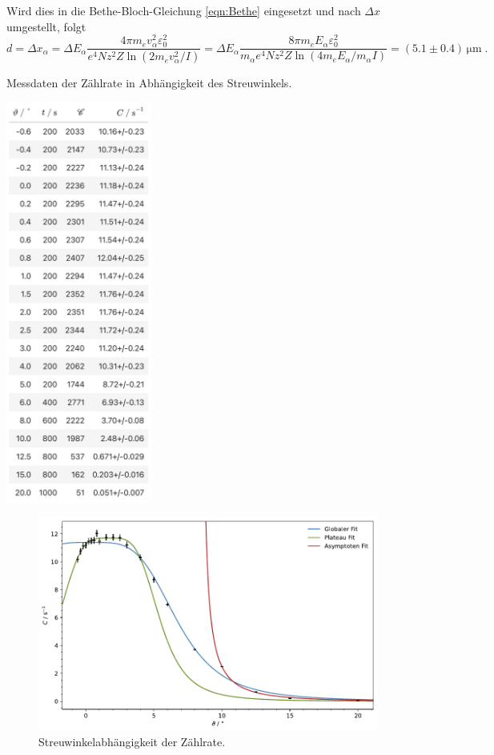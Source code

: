 Wird dies in die Bethe-Bloch-Gleichung \ref{eqn:Bethe} eingesetzt und nach $\Delta x$ umgestellt, folgt
$$d = \Delta x_\alpha = \Delta E_\alpha \frac{4\pi m_e v_\alpha^2 \varepsilon_0^2}{e^4 N z^2 Z \ln (2m_e v_\alpha^2 / I)}
= \Delta E_\alpha \frac{8\pi m_e E_\alpha \varepsilon_0^2}{m_\alpha e^4 N z^2 Z \ln (4m_e E_\alpha / m_\alpha I)} = (5.1\pm 0.4) \, \unit{\micro \meter}
\; .$$

\begin{table}[H]
    \centering
    \caption{Messdaten der Zählrate in Abhängigkeit des Streuwinkels.}
    \includegraphics[width=0.36\textwidth]{content/tabelle/Streuwinkel.jpg}
    \label{tab:Streuwinkel}
\end{table}

\begin{figure}[H]
    \centering
    \includegraphics[width=\textwidth]{content/messung/Streuwinkel.pdf}
    \caption{Streuwinkelabhängigkeit der Zählrate.}
    \label{fig:Streuwinkel}
\end{figure}
